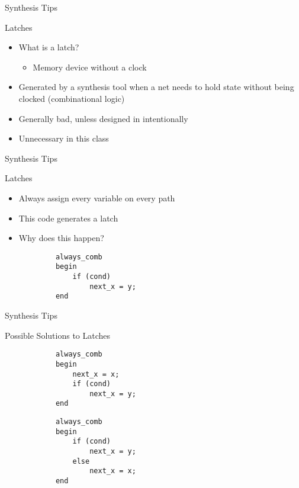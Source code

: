 \documentclass[table,dvipsnames,colorlinks=true]{beamer}
\begin{document}
\begin{frame}{Synthesis Tips}
    \begin{block}{Latches}
        \begin{itemize}
            \item What is a latch?
                \begin{itemize}
                    \item Memory device without a clock
                \end{itemize}
            \item Generated by a synthesis tool when a net needs to hold
                state without being clocked (combinational logic)
            \item Generally bad, unless designed in intentionally
            \item Unnecessary in this class
        \end{itemize}
    \end{block}
\end{frame}

\begin{frame}[fragile]{Synthesis Tips}
    \begin{block}{Latches}
        \begin{itemize}
            \item Always assign every variable on every path
            \item This code generates a latch
            \item Why does this happen?
        \end{itemize}
        \begin{verbatim}
            always_comb
            begin
                if (cond)
                    next_x = y;
            end
        \end{verbatim}
    \end{block}
\end{frame}

\begin{frame}[fragile]{Synthesis Tips}
    \begin{block}{Possible Solutions to Latches}
        \vspace*{-12pt}
        \begin{verbatim}
            always_comb
            begin
                next_x = x;
                if (cond)
                    next_x = y;
            end
        \end{verbatim}
        \begin{verbatim}
            always_comb
            begin
                if (cond)
                    next_x = y;
                else
                    next_x = x;
            end
        \end{verbatim}
    \end{block}
\end{frame}
\end{document}
